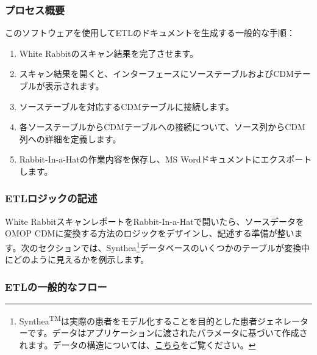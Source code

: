\documentclass[
  11pt]{book}
\providecommand{\tightlist}{%
  \setlength{\itemsep}{0pt}\setlength{\parskip}{0pt}}
\theoremstyle{definition}
\theoremstyle{definition}
\theoremstyle{definition}
\theoremstyle{definition}
\theoremstyle{remark}
\begin{document}
\subsubsection*{プロセス概要}\label{ux30d7ux30edux30bbux30b9ux6982ux8981-1}

このソフトウェアを使用してETLのドキュメントを生成する一般的な手順：

\begin{enumerate}
\def\labelenumi{\arabic{enumi}.}
\tightlist
\item
  White Rabbitのスキャン結果を完了させます。
\item
  スキャン結果を開くと、インターフェースにソーステーブルおよびCDMテーブルが表示されます。
\item
  ソーステーブルを対応するCDMテーブルに接続します。
\item
  各ソーステーブルからCDMテーブルへの接続について、ソース列からCDM列への詳細を定義します。
\item
  Rabbit-In-a-Hatの作業内容を保存し、MS Wordドキュメントにエクスポートします。
\end{enumerate}

\subsubsection*{ETLロジックの記述}\label{etlux30edux30b8ux30c3ux30afux306eux8a18ux8ff0}

White RabbitスキャンレポートをRabbit-In-a-Hatで開いたら、ソースデータをOMOP CDMに変換する方法のロジックをデザインし、記述する準備が整います。次のセクションでは、Synthea\footnote{Synthea\textsuperscript{TM}は実際の患者をモデル化することを目的とした患者ジェネレーターです。データはアプリケーションに渡されたパラメータに基づいて作成されます。データの構造については、\href{https://github.com/synthetichealth/synthea/wiki}{こちら}をご覧ください。}データベースのいくつかのテーブルが変換中にどのように見えるかを例示します。

\subsubsection*{ETLの一般的なフロー}\label{etlux306eux4e00ux822cux7684ux306aux30d5ux30edux30fc}
\end{document}
